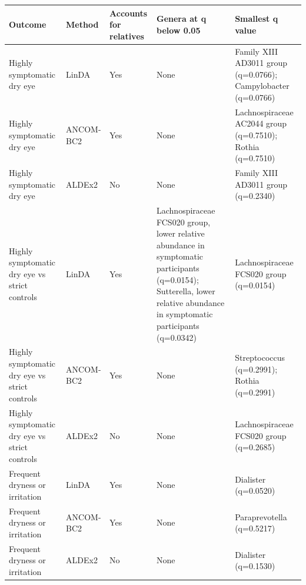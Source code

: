 \begin{tabular}{>{\raggedright\arraybackslash}p{}l>{\centering\arraybackslash}p{}>{\raggedright\arraybackslash}p{}>{\raggedright\arraybackslash}p{}}
\toprule
Outcome & Method & Accounts for relatives & Genera at q below 0.05 & Smallest q value \\
\midrule
Highly symptomatic dry eye & LinDA & Yes & None & Family XIII AD3011 group (q=0.0766); Campylobacter (q=0.0766) \\
Highly symptomatic dry eye & ANCOM-BC2 & Yes & None & Lachnospiraceae AC2044 group (q=0.7510); Rothia (q=0.7510) \\
Highly symptomatic dry eye & ALDEx2 & No & None & Family XIII AD3011 group (q=0.2340) \\
Highly symptomatic dry eye vs strict controls & LinDA & Yes & Lachnospiraceae FCS020 group, lower relative abundance in symptomatic participants (q=0.0154); Sutterella, lower relative abundance in symptomatic participants (q=0.0342) & Lachnospiraceae FCS020 group (q=0.0154) \\
Highly symptomatic dry eye vs strict controls & ANCOM-BC2 & Yes & None & Streptococcus (q=0.2991); Rothia (q=0.2991) \\
Highly symptomatic dry eye vs strict controls & ALDEx2 & No & None & Lachnospiraceae FCS020 group (q=0.2685) \\
Frequent dryness or irritation & LinDA & Yes & None & Dialister (q=0.0520) \\
Frequent dryness or irritation & ANCOM-BC2 & Yes & None & Paraprevotella (q=0.5217) \\
Frequent dryness or irritation & ALDEx2 & No & None & Dialister (q=0.1530) \\
\bottomrule
\end{tabular}
